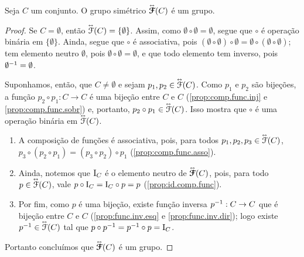 \begin{proposition}
Seja $C$ um conjunto. O grupo simétrico $\accentset{\leftrightarrow}{\bm{\mathcal{F}}}(C)$ é um grupo.
\end{proposition}
\begin{proof}
Se $C=\emptyset$, então $\accentset{\leftrightarrow}{\mathcal{F}}(C)=\{\emptyset\}$. Assim, como $\emptyset \circ \emptyset = \emptyset$, segue que $\circ$ é operação binária em $\{\emptyset\}$. Ainda, segue que $\circ$ é associativa, pois $(\emptyset \circ \emptyset) \circ \emptyset = \emptyset \circ (\emptyset \circ \emptyset)$; tem elemento neutro $\emptyset$, pois $\emptyset \circ \emptyset = \emptyset$, e que todo elemento tem inverso, pois $\emptyset^{-1} = \emptyset$.

Suponhamos, então, que $C \neq \emptyset$ e sejam $p_1,p_2 \in \accentset{\leftrightarrow}{\mathcal{F}}(C)$. Como $p_1$ e $p_2$ são bijeções, a função $p_2 \circ p_1: C \to C$ é uma bijeção entre $C$ e $C$ (\ref{prop:comp.func.inj} e \ref{prop:comp.func.sobr}) e, portanto, $p_2 \circ p_1 \in \accentset{\leftrightarrow}{\mathcal{F}}(C)$. Isso mostra que $\circ$ é uma operação binária em $\accentset{\leftrightarrow}{\mathcal{F}}(C)$.
	\begin{enumerate}
		\item A composição de funções é associativa, pois, para todos $p_1,p_2,p_3 \in \accentset{\leftrightarrow}{\mathcal{F}}(C)$, $p_3 \circ (p_2 \circ p_1) = (p_3 \circ p_2) \circ p_1$ (\ref{prop:comp.func.asso}).

		\item Ainda, notemos que $\mathrm{I}_C$ é o elemento neutro de $\accentset{\leftrightarrow}{\bm{\mathcal{F}}}(C)$, pois, para todo $p \in \accentset{\leftrightarrow}{\mathcal{F}}(C)$, vale $p \circ \mathrm{I}_C = \mathrm{I}_C \circ p = p$ (\ref{prop:id.comp.func}).

		\item Por fim, como $p$ é uma bijeção, existe função inversa $p^{-1}: C \to C$ que é bijeção entre $C$ e $C$ (\ref{prop:func.inv.esq} e \ref{prop:func.inv.dir}); logo existe $p^{-1} \in \accentset{\leftrightarrow}{\mathcal{F}}(C)$ tal que $p \circ p^{-1} = p^{-1} \circ p = \mathrm{I}_C$.
	\end{enumerate}
Portanto concluímos que $\accentset{\leftrightarrow}{\bm{\mathcal{F}}}(C)$ é um grupo.
\end{proof}

